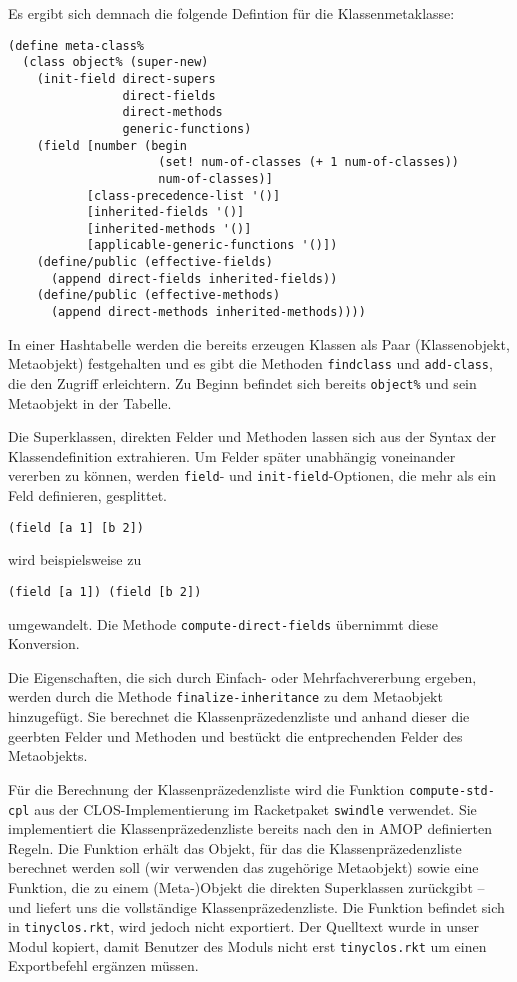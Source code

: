Es ergibt sich demnach die folgende Defintion für die Klassenmetaklasse:

\begin{lstlisting}
(define meta-class%
  (class object% (super-new)
    (init-field direct-supers
                direct-fields
                direct-methods
                generic-functions)
    (field [number (begin 
                     (set! num-of-classes (+ 1 num-of-classes))
                     num-of-classes)]
           [class-precedence-list '()]
           [inherited-fields '()]
           [inherited-methods '()]
           [applicable-generic-functions '()])    
    (define/public (effective-fields)
      (append direct-fields inherited-fields))
    (define/public (effective-methods)
      (append direct-methods inherited-methods))))
\end{lstlisting}

In einer Hashtabelle werden die bereits erzeugen Klassen als Paar (Klassenobjekt, Metaobjekt) festgehalten und es gibt die Methoden \texttt{findclass} und \texttt{add-class}, die den Zugriff erleichtern. Zu Beginn befindet sich bereits \texttt{object\%} und sein Metaobjekt in der Tabelle.

Die Superklassen, direkten Felder und Methoden lassen sich aus der Syntax der Klassendefinition extrahieren. Um Felder später unabhängig voneinander vererben zu können, werden \texttt{field}- und \texttt{init-field}-Optionen, die mehr als ein Feld definieren, gesplittet. 

\texttt{(field [a 1] [b 2])}

wird beispielsweise zu

\texttt{(field [a 1]) (field [b 2])}

umgewandelt. Die Methode \texttt{compute-direct-fields} übernimmt diese Konversion.

Die Eigenschaften, die sich durch Einfach- oder Mehrfachvererbung ergeben, werden durch die Methode \texttt{finalize-inheritance} zu dem Metaobjekt hinzugefügt. Sie berechnet die Klassenpräzedenzliste und anhand dieser die geerbten Felder und Methoden und bestückt die entprechenden Felder des Metaobjekts.

Für die Berechnung der Klassenpräzedenzliste wird die Funktion \texttt{compute-std-cpl} aus der CLOS-Implementierung im Racketpaket \texttt{swindle} verwendet. Sie implementiert die Klassenpräzedenzliste bereits nach den in AMOP definierten Regeln. Die Funktion erhält das Objekt, für das die Klassenpräzedenzliste berechnet werden soll (wir verwenden das zugehörige Metaobjekt) sowie eine Funktion, die zu einem (Meta-)Objekt die direkten Superklassen zurückgibt -- und liefert uns die vollständige Klassenpräzedenzliste. Die Funktion befindet sich in \texttt{tinyclos.rkt}, wird jedoch nicht exportiert. Der Quelltext wurde in unser Modul kopiert, damit Benutzer des Moduls nicht erst \texttt{tinyclos.rkt} um einen Exportbefehl ergänzen müssen. 

